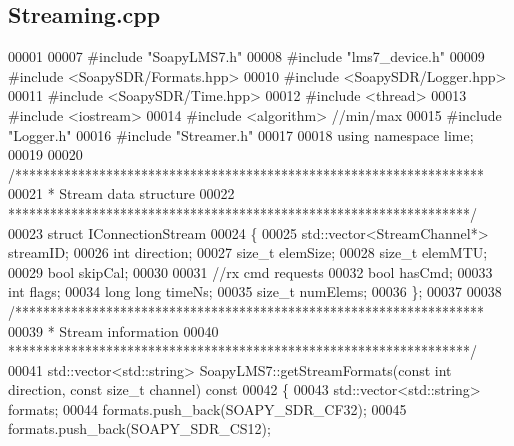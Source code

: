 \subsection{Streaming.\+cpp}
\label{Streaming_8cpp_source}

\begin{DoxyCode}
00001 
00007 \textcolor{preprocessor}{#include "SoapyLMS7.h"}
00008 \textcolor{preprocessor}{#include "lms7_device.h"}
00009 \textcolor{preprocessor}{#include <SoapySDR/Formats.hpp>}
00010 \textcolor{preprocessor}{#include <SoapySDR/Logger.hpp>}
00011 \textcolor{preprocessor}{#include <SoapySDR/Time.hpp>}
00012 \textcolor{preprocessor}{#include <thread>}
00013 \textcolor{preprocessor}{#include <iostream>}
00014 \textcolor{preprocessor}{#include <algorithm>} \textcolor{comment}{//min/max}
00015 \textcolor{preprocessor}{#include "Logger.h"}
00016 \textcolor{preprocessor}{#include "Streamer.h"}
00017 
00018 \textcolor{keyword}{using namespace }lime;
00019 
00020 \textcolor{comment}{/*******************************************************************}
00021 \textcolor{comment}{ * Stream data structure}
00022 \textcolor{comment}{ ******************************************************************/}
00023 \textcolor{keyword}{struct }IConnectionStream
00024 \{
00025     std::vector<StreamChannel*> streamID;
00026     \textcolor{keywordtype}{int} direction;
00027     \textcolor{keywordtype}{size\_t} elemSize;
00028     \textcolor{keywordtype}{size\_t} elemMTU;
00029     \textcolor{keywordtype}{bool} skipCal;
00030 
00031     \textcolor{comment}{//rx cmd requests}
00032     \textcolor{keywordtype}{bool} hasCmd;
00033     \textcolor{keywordtype}{int} flags;
00034     \textcolor{keywordtype}{long} \textcolor{keywordtype}{long} timeNs;
00035     \textcolor{keywordtype}{size\_t} numElems;
00036 \};
00037 
00038 \textcolor{comment}{/*******************************************************************}
00039 \textcolor{comment}{ * Stream information}
00040 \textcolor{comment}{ ******************************************************************/}
00041 std::vector<std::string> SoapyLMS7::getStreamFormats(\textcolor{keyword}{const} \textcolor{keywordtype}{int} direction, \textcolor{keyword}{const} \textcolor{keywordtype}{size\_t} channel)\textcolor{keyword}{ const}
00042 \textcolor{keyword}{}\{
00043     std::vector<std::string> formats;
00044     formats.push\_back(SOAPY\_SDR\_CF32);
00045     formats.push\_back(SOAPY\_SDR\_CS12);

\end{DoxyCode}
